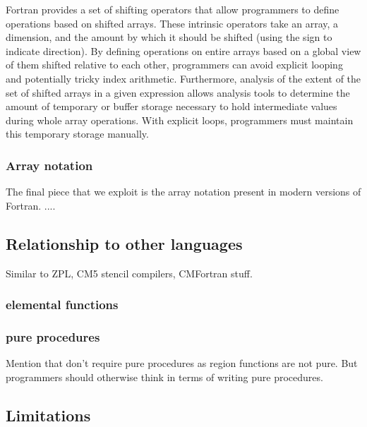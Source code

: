 \documentclass[10pt, conference, compsocconf]{IEEEtran}
\begin{document}
Fortran provides a set of shifting operators that allow programmers to
define operations based on shifted arrays.  These intrinsic operators take
an array, a dimension, and the amount by which it should be shifted (using
the sign to indicate direction).  By defining operations on entire arrays
based on a global view of them shifted relative to each other, programmers can
avoid explicit looping and potentially tricky index arithmetic.  Furthermore,
analysis of the extent of the set of shifted arrays in a given expression
allows analysis tools to determine the amount of temporary or buffer storage
necessary to hold intermediate values during whole array operations.  With
explicit loops, programmers must maintain this temporary storage manually.

\subsubsection*{Array notation}

The final piece that we exploit is the array notation present in modern
versions of Fortran.  ....

\subsection{Relationship to other languages}



Similar to ZPL, CM5 stencil compilers, CMFortran stuff.


%
% 

\subsubsection{elemental functions}

\subsubsection{pure procedures}

Mention that don't require pure procedures as region functions are not pure.
But programmers should otherwise think in terms of writing pure procedures.

\subsection{Limitations}
\end{document}
